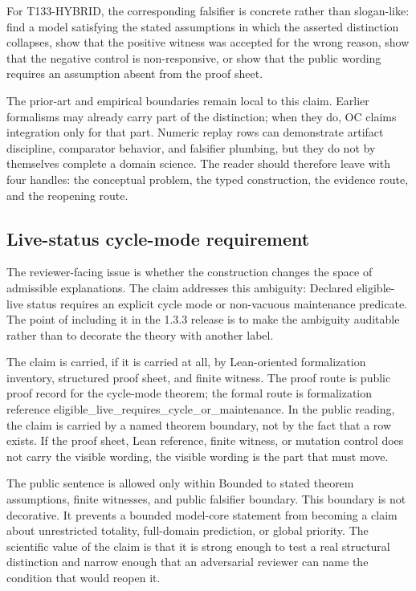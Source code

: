 For T133-HYBRID, the corresponding falsifier is concrete rather than slogan-like: find a model satisfying the stated assumptions in which the asserted distinction collapses, show that the positive witness was accepted for the wrong reason, show that the negative control is non-responsive, or show that the public wording requires an assumption absent from the proof sheet.

The prior-art and empirical boundaries remain local to this claim. Earlier formalisms may already carry part of the distinction; when they do, OC claims integration only for that part. Numeric replay rows can demonstrate artifact discipline, comparator behavior, and falsifier plumbing, but they do not by themselves complete a domain science. The reader should therefore leave with four handles: the conceptual problem, the typed construction, the evidence route, and the reopening route.

\subsection{Live-status cycle-mode requirement}
The reviewer-facing issue is whether the construction changes the space of admissible explanations. The claim addresses this ambiguity: Declared eligible-live status requires an explicit cycle mode or non-vacuous maintenance predicate. The point of including it in the 1.3.3 release is to make the ambiguity auditable rather than to decorate the theory with another label.

The claim is carried, if it is carried at all, by Lean-oriented formalization inventory, structured proof sheet, and finite witness. The proof route is public proof record for the cycle-mode theorem; the formal route is formalization reference eligible\_live\_requires\_cycle\_or\_maintenance. In the public reading, the claim is carried by a named theorem boundary, not by the fact that a row exists. If the proof sheet, Lean reference, finite witness, or mutation control does not carry the visible wording, the visible wording is the part that must move.

The public sentence is allowed only within Bounded to stated theorem assumptions, finite witnesses, and public falsifier boundary. This boundary is not decorative. It prevents a bounded model-core statement from becoming a claim about unrestricted totality, full-domain prediction, or global priority. The scientific value of the claim is that it is strong enough to test a real structural distinction and narrow enough that an adversarial reviewer can name the condition that would reopen it.

